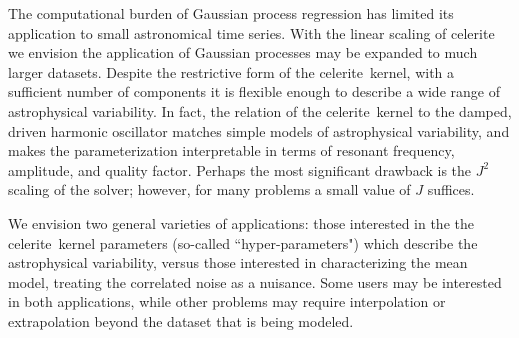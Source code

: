 \documentclass[manuscript, letterpaper]{aastex6}
\makeatletter
\let\origsection\section
\renewcommand\section{\@ifstar{\starsection}{\nostarsection}}
\newcommand\nostarsection[1]{\sectionprelude\origsection{#1}}
\newcommand\starsection[1]{\sectionprelude\origsection*{#1}}
\newcommand\sectionprelude{\vspace{1em}}
\newcommand{\project}[1]{\textsf{#1}}
\newcommand{\celerite}{\project{celerite}}
\makeatother
\begin{document}
\section{Summary}

The computational burden of Gaussian process regression has limited its application
to small astronomical time series.  With the linear scaling of \celerite\, we
envision the application of Gaussian processes may be expanded to much larger
datasets.  Despite the restrictive form of the \celerite\ kernel, with a
sufficient number of components it is flexible enough to describe a wide
range of astrophysical variability.  In fact, the relation of the \celerite\ kernel
to the damped, driven harmonic oscillator matches simple models of astrophysical
variability, and makes the parameterization interpretable in terms of resonant
frequency, amplitude, and quality factor.  Perhaps the most significant drawback
is the $J^2$ scaling of the solver;  however, for many problems a small value of $J$
suffices.

We envision two general varieties of applications:  those interested in the
the \celerite\ kernel parameters (so-called ``hyper-parameters") which describe the
astrophysical variability, versus those interested in characterizing the mean
model, treating the correlated noise as a nuisance.  Some users may
be interested in both applications, while other problems may require interpolation
or extrapolation beyond the dataset that is being modeled.

\end{document}
